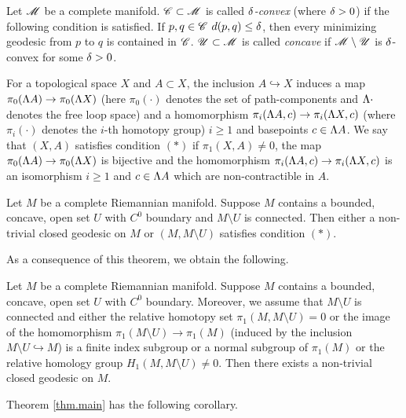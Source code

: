 \documentclass[11pt,twoside]{article}
\begin{document}
\begin{defn}\label{d.conv}
Let \(\mathscr{M}\) be a complete \Rm manifold. \(\mathscr{C}\subset \mathscr{M}\) is called \textit{\(\delta\)-convex} (where $\delta>0$) if the following condition is satisfied. If \(p,q\in \mathscr{C}\) \sot \(d(p,q)\leq \delta\), then every minimizing geodesic from $p$ to $q$ is contained in $\mathscr{C}$. \(\mathscr{U} \subset \mathscr{M}\) is called \textit{concave} if \(\mathscr{M} \setminus \mathscr{U}\) is \(\delta\)-convex for some $\delta>0$.
\end{defn}

For a topological space \(X\) and $A\subset X$, the inclusion $A \hookrightarrow X$ induces a map $\pi_0(\Lambda A)\rightarrow \pi_0(\Lambda X)$ (here $\pi_0(\cdot)$ denotes the set of path-components and $\Lambda \cdot$ denotes the free loop space) and a homomorphism \(\pi_i(\Lambda A, c)\rightarrow \pi_i(\Lambda X, c)\) (where $\pi_i(\cdot)$ denotes the $i$-th homotopy group) \fa \(i\geq 1\) and basepoints \(c\in \Lambda A\). We say that $(X,A)$ satisfies condition $(*)$ if $\pi_1(X,A)\neq 0$, the map $\pi_0(\Lambda A)\rightarrow \pi_0(\Lambda X)$ is bijective and the homomorphism \(\pi_i(\Lambda A, c)\rightarrow \pi_i(\Lambda X, c)\) is an isomorphism \fa \(i\geq 1\) and  \(c\in \Lambda A\) which are non-contractible in $A$.

\begin{thm}\label{thm}
Let $M$ be a complete Riemannian manifold. Suppose $M$ contains a bounded, concave, open set $U$ with $C^0$ boundary and $M\setminus U$ is connected. Then either \tes a non-trivial closed geodesic on $M$ or $(M,M\setminus U)$ satisfies condition $(*)$.
\end{thm} 

As a consequence of this theorem, we obtain the following.

\begin{thm}\label{thm.main}
Let $M$ be a complete Riemannian manifold. Suppose $M$ contains a bounded, concave, open set $U$ with $C^0$ boundary. Moreover, we assume that \(M\setminus U\) is connected and either the relative homotopy set $\pi_1(M,M\setminus U)=0$ or the image of the homomorphism $\pi_1(M\setminus U)\rightarrow \pi_1(M)$ (induced by the inclusion $M\setminus U\hookrightarrow M$) is a finite index subgroup or a normal subgroup of $\pi_1(M)$ or the relative homology group $H_1(M,M\setminus U)\neq 0$. Then there exists a non-trivial closed geodesic on $M$.
\end{thm}

Theorem \ref{thm.main} has the following corollary.

\end{document}
